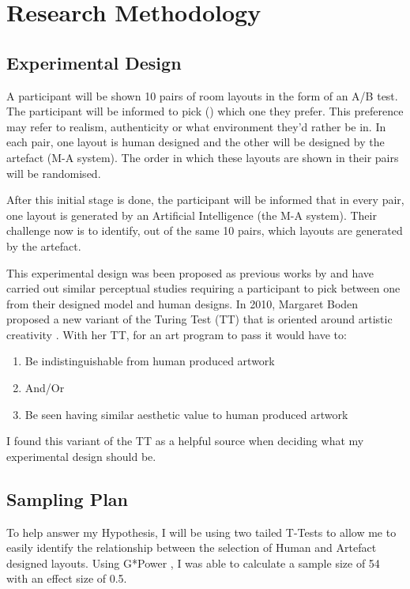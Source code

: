 \section{Research Methodology}


\subsection{Experimental Design}
A participant will be shown 10 pairs of room layouts in the form of an A/B test. The participant will be informed to pick () which one they prefer.
This preference may refer to realism, authenticity or what environment they'd rather be in. In each pair, one layout is human designed and the other will be designed by the artefact (M-A system). The order in which these layouts are shown in their pairs will be randomised.

After this initial stage is done, the participant will be informed that in every pair, one layout is generated by an Artificial Intelligence (the M-A system). Their challenge now is to identify, out of the same 10 pairs, which layouts are generated by the artefact.

This experimental design was been proposed as previous works by  \cite{constrained-layouts} and  \cite{make-it-home} have carried out similar perceptual studies requiring a participant to pick between one from their designed model and human designs. In 2010, Margaret Boden proposed a new variant of the Turing Test (TT) that is oriented around artistic creativity \cite{artistic-tt}. With her TT, for an art program to pass it would have to:
\begin{enumerate}
    \item Be indistinguishable from human produced artwork
    \item[]And/Or
    \item Be seen having similar aesthetic value to human produced artwork
\end{enumerate}
I found this variant of the TT as a helpful source when deciding what my experimental design should be.

\subsection{Sampling Plan}
To help answer my Hypothesis, I will be using two tailed T-Tests to allow me to easily identify the relationship between the selection of Human and Artefact designed layouts.
Using G*Power \cite{gpower}, I was able to calculate a sample size of 54 with an effect size of 0.5. 

